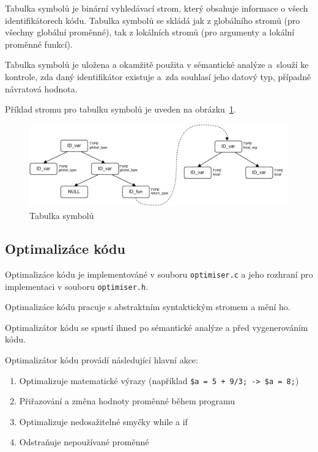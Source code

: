 \documentclass[a4paper, 11pt]{article}
\begin{document}
    Tabulka symbolů je binární vyhledávací strom, který obsahuje informace o všech identifikátorech kódu. Tabulka symbolů se skládá jak z globálního stromů (pro všechny globální proměnné), tak z lokálních stromů (pro argumenty a lokální proměnné funkcí).


    Tabulka symbolů je uložena a okamžitě použita v sémantické analýze a~slouží ke kontrole, zda daný identifikátor existuje a~zda souhlasí jeho datový typ, případně návratová hodnota.


	Příklad stromu pro tabulku symbolů je uveden na obrázku~\ref{figure:sem_anal_example}.

	\begin{figure}[!ht]
		\centering
		\includegraphics[width=1\linewidth]{sem_anal.pdf}
		\caption{Tabulka symbolů}
		\label{figure:sem_anal_example}
	\end{figure}

    \subsection{Optimalizáce kódu}
    Optimalizáce kódu je implementováné v souboru \texttt{optimiser.c} a jeho rozhraní pro implementaci v souboru \texttt{optimiser.h}.

    Optimalizáce kódu pracuje s abstraktním syntaktickým stromem a mění ho.

    Optimalizátor kódu se spustí ihned po sémantické analýze a před vygenerováním kódu.

    Optimalizátor kódu provádí následující hlavní akce:
    \begin{enumerate}
        \item Optimalizuje matematické výrazy (například \texttt{\$a = 5 + 9/3; -> \$a = 8;})
        \item Přiřazování a změna hodnoty proměnné během programu
        \item Optimalizuje nedosažitelné smyčky while a if
        \item Odstraňuje nepoužívané proměnné
    \end{enumerate}
\end{document}
